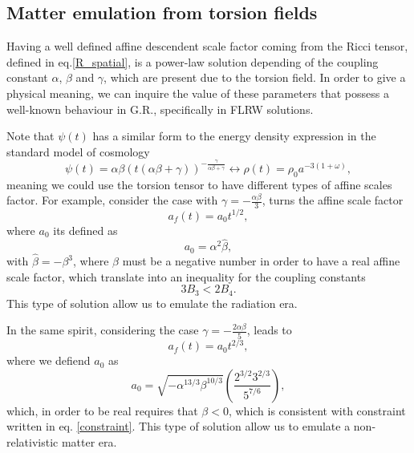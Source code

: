 \documentclass{article}
\begin{document}
\subsection{Matter emulation from torsion fields}

Having a well defined affine descendent scale factor coming from the Ricci tensor, defined in eq.\eqref{R_spatial}, is a power-law 
solution depending of the coupling constant $\alpha$, $\beta$ and $\gamma$, which are present due to the torsion field. In order 
to give a physical meaning, we can inquire the value of these parameters that possess a well-known behaviour in G.R., specifically
in FLRW solutions.

Note that $\psi(t)$ has a similar form to the energy density expression in the standard model of cosmology
\begin{equation}
    \psi(t) = \alpha\beta\left(t\left(\alpha\beta + \gamma\right)\right)^{-\frac{\gamma}{\alpha\beta + \gamma}} \longleftrightarrow
    \rho(t) = \rho_0 a^{-3\left(1 + \omega\right)},
\end{equation}
meaning we could use the torsion tensor to have different types of affine scales factor. For example, consider the case 
with $\gamma = -\frac{\alpha\beta}{3}$, turns the affine scale factor
\begin{equation}
    a_f(t) = a_0 t^{1/2},
\end{equation}
where $a_0$ its defined as 
\begin{equation}
    a_0 = \alpha^2 \hat{\beta},
\end{equation}
with $\hat{\beta} = -\beta^3$, where $\beta$ must be a negative number in order to have a real affine scale factor, which translate into an inequality
for the coupling constants
\begin{equation}
    \label{constraint}
    3B_3 < 2B_4.
\end{equation}
This type of solution allow us to emulate the radiation era. 

In the same spirit, considering the case $\gamma = -\frac{2\alpha\beta}{5}$, leads to
\begin{equation}
    a_f(t) = a_{0}t^{2/3},
\end{equation}
where we defiend $a_0$ as 
\begin{equation}
    a_0 = \sqrt{-\alpha^{13/3}\beta^{10/3}}\left(\frac{2^{3/2}3^{2/3}}{5^{7/6}}\right),
\end{equation}    
which, in order to be real requires that $\beta <0$, which is consistent with constraint 
written in eq. \eqref{constraint}. This type of solution allow us to emulate a non-relativistic 
matter era.
\end{document}

